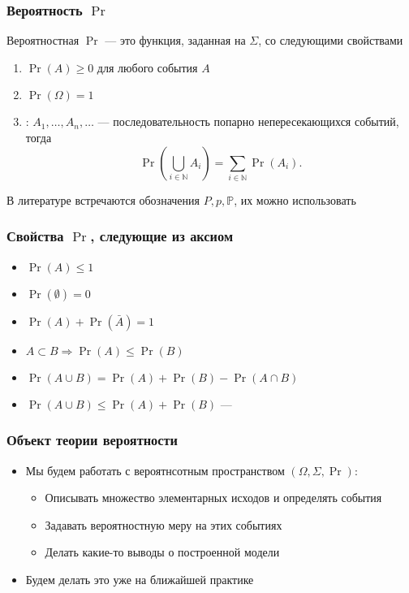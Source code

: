 \documentclass[hyperref=unicode,graphics=pdflatex,13pt,xcolor={usenames,dvipsnames}]{beamer}
\newcommand\hl[1]{{\color{blue}{#1}}}
\newcommand\pitem{\pause\item}
\newcommand\N{\mathbb{N}}
\begin{document}
\begin{frame}
  \frametitle{Вероятность $\Pr$}

  Вероятностная \hl{мера} $\Pr$ --- это функция, заданная на $\Sigma$, со следующими свойствами
  \begin{enumerate}
    \pitem \hl{Неотрицательность:} $\Pr(A) \ge 0$ для любого события $A$
    \pitem \hl{Нормализация:} $\Pr(\Omega) = 1$
    \pitem \hl{Счетная аддитивнотсь}: $A_1, \dots, A_n, \dots$ --- последовательность попарно непересекающихся событий, тогда
    \[
      \Pr\left(\bigcup\limits_{i \in \N} A_i\right) = \sum_{i \in \N} \Pr(A_i).
    \] 
  \end{enumerate}
  \hl{NB:} В литературе встречаются обозначения $P, p, \mathbb{P}$, их можно использовать
\end{frame}

\begin{frame}
  \frametitle{Свойства $\Pr$, следующие из аксиом}
  \begin{itemize}
    \item $\Pr(A) \le 1$
    \item $\Pr(\emptyset) = 0$
    \item $\Pr(A) + \Pr(\bar A) = 1$
    \item $A \subset B \Rightarrow \Pr(A) \le \Pr(B)$
    \item $\Pr(A \cup B) = \Pr(A) + \Pr(B) - \Pr(A \cap B)$
    \item $\Pr(A \cup B) \le \Pr(A) + \Pr(B)$ --- \hl{Union bound}
  \end{itemize}
\end{frame}

\begin{frame}
  \frametitle{Объект теории вероятности}
  \begin{itemize}
    \item Мы будем работать с вероятнсотным пространством $(\Omega, \Sigma, \Pr)$:
    \begin{itemize}
      \item Описывать множество элементарных исходов и определять события
      \item Задавать вероятностную меру на этих событиях
      \item Делать какие-то выводы о построенной модели
    \end{itemize}
    \item Будем делать это уже на ближайшей практике \smiley
  \end{itemize}
\end{frame}
\end{document}
